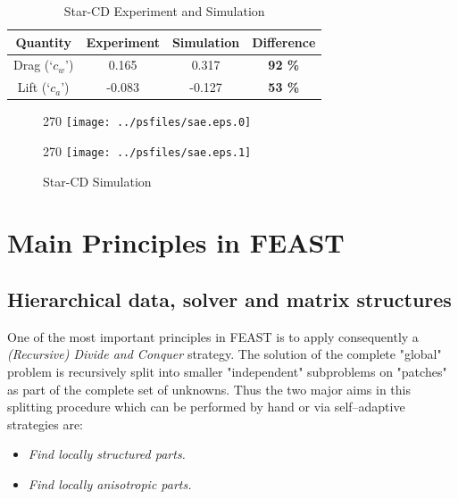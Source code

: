 \begin{table}[!h]
\begin{center}
\begin{tabular}{|c||c|c||c|} \hline
{\bf Quantity}     & {\bf Experiment}  & {\bf Simulation}& {\bf Difference}\\ \hline
%
Drag (`$c_w$') & 0.165 & 0.317& {\bf 92 \%} \\
Lift (`$c_a$')   & -0.083 & -0.127& {\bf 53 \%} \\ \hline
\end{tabular}
\end{center}
\caption{Star-CD Experiment and Simulation}
\end{table}


\begin{figure}[!h]
\begin{center}
\begin{rotate}{270}
\texttt{[image: ../psfiles/sae.eps.0]}
\end{rotate}
\hspace*{7.25cm}\begin{turn}{270}
 \texttt{[image: ../psfiles/sae.eps.1]}
\end{turn}
\end{center}
\caption{Star-CD Simulation}
\end{figure}






\section{Main Principles in FEAST}

\subsection{Hierarchical data, solver and matrix structures}


One of the most important principles in {\sc FEAST} is to apply consequently a 
{\it (Recursive) Divide and Conquer} strategy. The solution of the complete "global" problem is recursively 
split into smaller "independent" subproblems on "patches" as part of the complete set of unknowns. 
Thus the two major aims in this splitting procedure which can be performed by hand or via self--adaptive 
strategies are:

\begin{itemize}
\item {\em Find locally structured parts.}
\item {\em Find locally anisotropic parts.}
\end{itemize}

